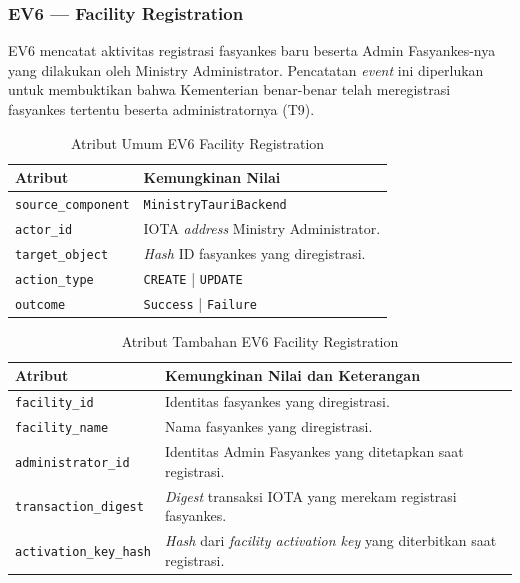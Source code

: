 \subsubsection{EV6 --- Facility Registration}
\label{subsec:ev6-facility-registration}

EV6 mencatat aktivitas registrasi fasyankes baru beserta Admin Fasyankes-nya
yang dilakukan oleh Ministry Administrator. Pencatatan \textit{event} ini
diperlukan untuk membuktikan bahwa Kementerian benar-benar telah meregistrasi
fasyankes tertentu beserta administratornya (T9).

\begin{table}[htbp]
\centering
\caption{Atribut Umum EV6 Facility Registration}
\label{tab:ev6-umum}
\renewcommand{\arraystretch}{1.3}
\begin{tabular}{|p{3.5cm}|p{8.5cm}|}
\hline
\textbf{Atribut} & \textbf{Kemungkinan Nilai} \\
\hline
\texttt{source\_component} &
\texttt{MinistryTauriBackend} \\
\hline
\texttt{actor\_id} &
IOTA \textit{address} Ministry Administrator. \\
\hline
\texttt{target\_object} &
\textit{Hash} ID fasyankes yang diregistrasi. \\
\hline
\texttt{action\_type} &
\texttt{CREATE} | \texttt{UPDATE} \\
\hline
\texttt{outcome} &
\texttt{Success} | \texttt{Failure} \\
\hline
\end{tabular}
\end{table}

\begin{table}[htbp]
\centering
\caption{Atribut Tambahan EV6 Facility Registration}
\label{tab:ev6-detail}
\renewcommand{\arraystretch}{1.3}
\begin{tabular}{|p{4cm}|p{7.5cm}|}
\hline
\textbf{Atribut} & \textbf{Kemungkinan Nilai dan Keterangan} \\
\hline
\texttt{facility\_id} &
Identitas fasyankes yang diregistrasi. \\
\hline
\texttt{facility\_name} &
Nama fasyankes yang diregistrasi. \\
\hline
\texttt{administrator\_id} &
Identitas Admin Fasyankes yang ditetapkan saat registrasi. \\
\hline
\texttt{transaction\_digest} &
\textit{Digest} transaksi IOTA yang merekam registrasi fasyankes. \\
\hline
\texttt{activation\_key\_hash} &
\textit{Hash} dari \textit{facility activation key} yang diterbitkan
saat registrasi. \\
\hline
\end{tabular}
\end{table}

